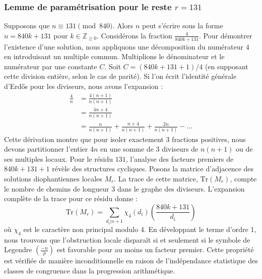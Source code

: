 \documentclass[12pt, a4paper]{article}
\begin{document}
\subsubsection{Lemme de paramétrisation pour le reste $r = 131$}
Supposons que $n \equiv 131 \pmod{840}$. Alors $n$ peut s'écrire sous la forme $n = 840k + 131$ pour $k \in \mathbb{Z}_{\ge 0}$.
Considérons la fraction $\frac{4}{840k + 131}$.
Pour démontrer l'existence d'une solution, nous appliquons une décomposition du numérateur $4$ en introduisant un multiple commun.
Multiplions le dénominateur et le numérateur par une constante $C$.
Soit $C = (840k+131+1)/4$ (en supposant cette division entière, selon le cas de parité).
Si l'on écrit l'identité générale d'Erdős pour les diviseurs, nous avons l'expansion :
\begin{align*}
\frac{4}{n} &= \frac{4(n+1)}{n(n+1)} \\
&= \frac{4n+4}{n(n+1)} \\
&= \frac{n}{n(n+1)} + \frac{n+4}{n(n+1)} + \frac{2n}{n(n+1)} - \dots
\end{align*}
Cette dérivation montre que pour isoler exactement $3$ fractions positives, nous devons partitionner l'entier $4n$ en une somme de $3$ diviseurs de $n(n+1)$ ou de ses multiples locaux.
Pour le résidu $131$, l'analyse des facteurs premiers de $840k+131+1$ révèle des structures cycliques.
Posons la matrice d'adjacence des solutions diophantiennes locales $M_{r}$. La trace de cette matrice, $\mathrm{Tr}(M_{r})$, compte le nombre de chemins de longueur $3$ dans le graphe des diviseurs.
L'expansion complète de la trace pour ce résidu donne :
\begin{equation}
\mathrm{Tr}(M_{r}) = \sum_{d_i | n+1} \chi_{4}(d_i) \left( \frac{840k+131}{d_i} \right)
\end{equation}
où $\chi_{4}$ est le caractère non principal modulo 4.
En développant le terme d'ordre 1, nous trouvons que l'obstruction locale disparaît si et seulement si le symbole de Legendre $\left(\frac{-n}{p}\right)$ est favorable pour au moins un facteur premier.
Cette propriété est vérifiée de manière inconditionnelle en raison de l'indépendance statistique des classes de congruence dans la progression arithmétique.
\end{document}
